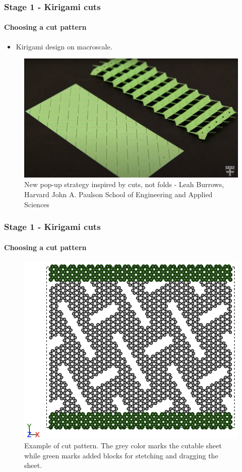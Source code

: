 \documentclass[
	10pt, %
]{beamer}
\begin{document}
\begin{frame}
	\frametitle{Stage 1 - Kirigami cuts}
	\framesubtitle{Choosing a cut pattern}

	\begin{itemize}
		\item Kirigami design on macroscale.
	\end{itemize}
	\begin{figure}
		\includegraphics[width=0.6\linewidth]{figures/kirigami_pattern_inspiration.png}
		\caption{New pop-up strategy inspired by cuts, not folds - Leah Burrows, Harvard John A. Paulson School of Engineering and Applied Sciences }
	\end{figure}	

	
\end{frame}


\begin{frame}
	\frametitle{Stage 1 - Kirigami cuts}
	\framesubtitle{Choosing a cut pattern}


	\begin{figure}
		\includegraphics[width=0.6\linewidth]{figures/cutpattern.png}
		\caption{Example of cut pattern. The grey color marks the cutable sheet while green marks added blocks for stetching and dragging the sheet.}
	\end{figure}	

\end{frame}
\end{document}
